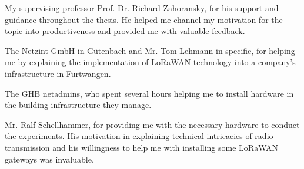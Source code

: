 My supervising professor Prof. Dr. Richard Zahoransky, for his support and guidance throughout the thesis.
He helped me channel my motivation for the topic into productiveness and provided me with valuable feedback.

The Netzint GmbH in Gütenbach and Mr. Tom Lehmann in specific, for helping me by explaining the implementation of \ac{LoRaWAN} technology into a company's infrastructure in Furtwangen.

The \ac{GHB} netadmins, who spent several hours helping me to install hardware in the building infrastructure they manage.

Mr. Ralf Schellhammer, for providing me with the necessary hardware to conduct the experiments.
His motivation in explaining technical intricacies of radio transmission and his willingness to help me with installing some \ac{LoRaWAN} gateways was invaluable.